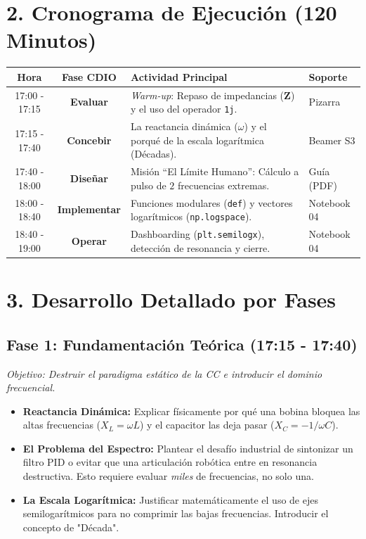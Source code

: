 \documentclass[11pt,a4paper]{article}
\begin{document}
\section*{2. Cronograma de Ejecución (120 Minutos)}
\begin{table}[h!]
    \centering
    \renewcommand{\arraystretch}{1.3}
    \begin{tabularx}{\textwidth}{@{} c c X l @{}}
        \toprule
        \textbf{Hora} & \textbf{Fase CDIO} & \textbf{Actividad Principal} & \textbf{Soporte} \\
        \midrule
        17:00 - 17:15 & \textbf{Evaluar} & \textit{Warm-up}: Repaso de impedancias ($\mathbf{Z}$) y el uso del operador \texttt{1j}. & Pizarra \\
        17:15 - 17:40 & \textbf{Concebir} & La reactancia dinámica ($\omega$) y el porqué de la escala logarítmica (Décadas). & Beamer S3 \\
        17:40 - 18:00 & \textbf{Diseñar} & Misión ``El Límite Humano'': Cálculo a pulso de $2$ frecuencias extremas. & Guía (PDF) \\
        18:00 - 18:40 & \textbf{Implementar} & Funciones modulares (\texttt{def}) y vectores logarítmicos (\texttt{np.logspace}). & Notebook 04 \\
        18:40 - 19:00 & \textbf{Operar} & Dashboarding (\texttt{plt.semilogx}), detección de resonancia y cierre. & Notebook 04 \\
        \bottomrule
    \end{tabularx}
\end{table}

\section*{3. Desarrollo Detallado por Fases}

\subsection*{Fase 1: Fundamentación Teórica (17:15 - 17:40)}
\textit{Objetivo: Destruir el paradigma estático de la CC e introducir el dominio frecuencial.}
\begin{itemize}
    \item \textbf{Reactancia Dinámica:} Explicar físicamente por qué una bobina bloquea las altas frecuencias ($X_L = \omega L$) y el capacitor las deja pasar ($X_C = -1/\omega C$).
    \item \textbf{El Problema del Espectro:} Plantear el desafío industrial de sintonizar un filtro PID o evitar que una articulación robótica entre en resonancia destructiva. Esto requiere evaluar \textit{miles} de frecuencias, no solo una.
    \item \textbf{La Escala Logarítmica:} Justificar matemáticamente el uso de ejes semilogarítmicos para no comprimir las bajas frecuencias. Introducir el concepto de "Década".
\end{itemize}
\end{document}
